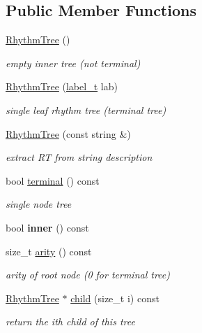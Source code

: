 \subsection*{Public Member Functions}
\begin{DoxyCompactItemize}
\item 
\mbox{\hyperlink{group__output_gac7614a6239a4917c771641dfdfd597ab}{Rhythm\+Tree}} ()
\begin{DoxyCompactList}\small\item\em empty inner tree (not terminal) \end{DoxyCompactList}\item 
\mbox{\hyperlink{group__output_gac868521df843e116ef04bcfa52405d01}{Rhythm\+Tree}} (\mbox{\hyperlink{group__output_ga22fde970e635fcf63962743b2d5c441d}{label\+\_\+t}} lab)
\begin{DoxyCompactList}\small\item\em single leaf rhythm tree (terminal tree) \end{DoxyCompactList}\item 
\mbox{\hyperlink{group__output_ga058c6d59881e1be259594165d19c8588}{Rhythm\+Tree}} (const string \&)
\begin{DoxyCompactList}\small\item\em extract RT from string description \end{DoxyCompactList}\item 
bool \mbox{\hyperlink{group__output_ga4f875cf76d3ebc8270a471ef57e93ddd}{terminal}} () const
\begin{DoxyCompactList}\small\item\em single node tree \end{DoxyCompactList}\item 
\mbox{\label{classRhythmTree_a67a3180bb74745a6e81f88835a74f740}} 
bool {\bfseries inner} () const
\item 
size\+\_\+t \mbox{\hyperlink{group__output_ga813a6feea3e6aa565fa0aed29e970a4e}{arity}} () const
\begin{DoxyCompactList}\small\item\em arity of root node (0 for terminal tree) \end{DoxyCompactList}\item 
\mbox{\hyperlink{classRhythmTree}{Rhythm\+Tree}} $\ast$ \mbox{\hyperlink{group__output_ga130dd34b9f3e0db4ad4f185181895dbd}{child}} (size\+\_\+t i) const
\begin{DoxyCompactList}\small\item\em return the ith child of this tree \end{DoxyCompactList}\item 

\end{DoxyCompactItemize}

